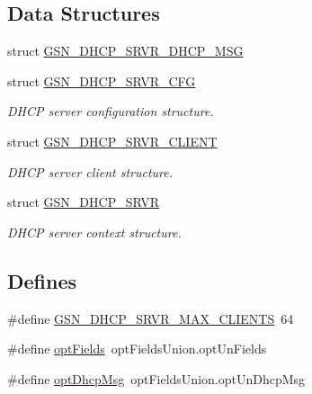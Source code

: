 \subsection*{Data Structures}
\begin{DoxyCompactItemize}
\item 
struct \hyperlink{a00046}{GSN\_\-DHCP\_\-SRVR\_\-DHCP\_\-MSG}
\item 
struct \hyperlink{a00044}{GSN\_\-DHCP\_\-SRVR\_\-CFG}
\begin{DoxyCompactList}\small\item\em DHCP server configuration structure. \end{DoxyCompactList}\item 
struct \hyperlink{a00045}{GSN\_\-DHCP\_\-SRVR\_\-CLIENT}
\begin{DoxyCompactList}\small\item\em DHCP server client structure. \end{DoxyCompactList}\item 
struct \hyperlink{a00043}{GSN\_\-DHCP\_\-SRVR}
\begin{DoxyCompactList}\small\item\em DHCP server context structure. \end{DoxyCompactList}\end{DoxyCompactItemize}
\subsection*{Defines}
\begin{DoxyCompactItemize}
\item 
\#define \hyperlink{a00482_acbcc05b8f8e281cd1d4a25697a4d7fd8}{GSN\_\-DHCP\_\-SRVR\_\-MAX\_\-CLIENTS}~64
\item 
\#define \hyperlink{a00482_af6676f1b75f7325a0d8f728b2ea24602}{optFields}~optFieldsUnion.optUnFields
\item 
\#define \hyperlink{a00482_a15c82ef794d07726fd4fa71e7c66ae50}{optDhcpMsg}~optFieldsUnion.optUnDhcpMsg
\end{DoxyCompactItemize}
